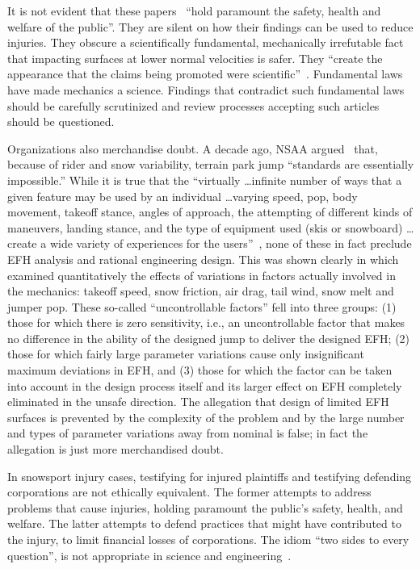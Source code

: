 \documentclass[fleqn,10pt,lineno]{wlpeerj}
\begin{document}
It is not evident that these papers~\citep{Shealy2010,Shealy2015,Scher2015}
``hold paramount the safety, health and welfare of the public''. They are
silent on how their findings can be used to reduce injuries. They obscure a
scientifically fundamental, mechanically irrefutable fact that impacting
surfaces at lower normal velocities is safer. They ``create the appearance that
the claims being promoted were scientific''~\citep[page 244]{Oreskes2010}.
Fundamental laws have made mechanics a science. Findings that contradict such
fundamental laws should be carefully scrutinized and review processes accepting
such articles should be questioned.

Organizations also merchandise doubt. A decade ago, NSAA
argued~\citep{NSAA2008} that, because of rider and snow variability, terrain
park jump ``standards are essentially impossible.'' While it is true that the
``virtually \ldots infinite number of ways that a given feature may be used by
an individual \ldots varying speed, pop, body movement, takeoff stance, angles
of approach, the attempting of different kinds of maneuvers, landing stance,
and the type of equipment used (skis or snowboard) \ldots create a wide variety
of experiences for the users''~\citep{NSAA2008}, none of these in fact preclude
EFH analysis and rational engineering design.  This was shown clearly in
\cite{Hubbard2012} which examined quantitatively the effects of variations in
factors actually involved in the mechanics: takeoff speed, snow friction, air
drag, tail wind, snow melt and jumper pop. These so-called ``uncontrollable
factors'' fell into three groups: (1) those for which there is zero
sensitivity, i.e., an uncontrollable factor that makes no difference in the
ability of the designed jump to deliver the designed EFH; (2) those for which
fairly large parameter variations cause only insignificant maximum deviations
in EFH, and (3) those for which the factor can be taken into account in the
design process itself and its larger effect on EFH completely eliminated in the
unsafe direction. The allegation that design of limited EFH surfaces is
prevented by the complexity of the problem and by the large number and types of
parameter variations away from nominal is false; in fact the allegation is just
more merchandised doubt.

In snowsport injury cases, testifying for injured plaintiffs and testifying
defending corporations are not ethically equivalent. The former attempts to
address problems that cause injuries, holding paramount the public's safety,
health, and welfare. The latter attempts to defend practices that might have
contributed to the injury, to limit financial losses of corporations. The idiom
``two sides to every question'', is not appropriate in science and
engineering~\citep[page 268]{Oreskes2010}.
\end{document}

